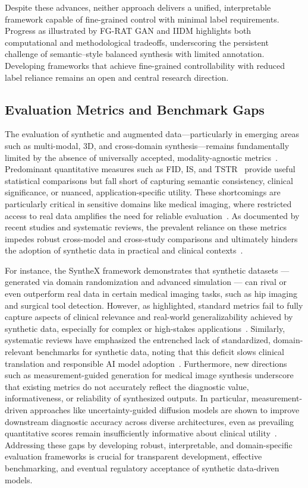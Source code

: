 \documentclass[sigconf]{acmart}
\begin{document}
Despite these advances, neither approach delivers a unified, interpretable framework capable of fine-grained control with minimal label requirements. Progress as illustrated by FG-RAT GAN and IIDM highlights both computational and methodological tradeoffs, underscoring the persistent challenge of semantic–style balanced synthesis with limited annotation. Developing frameworks that achieve fine-grained controllability with reduced label reliance remains an open and central research direction.

\subsection{Evaluation Metrics and Benchmark Gaps}

The evaluation of synthetic and augmented data—particularly in emerging areas such as multi-modal, 3D, and cross-domain synthesis—remains fundamentally limited by the absence of universally accepted, modality-agnostic metrics~\cite{ref35,ref52,ref53,ref81,ref89,ref91}. Predominant quantitative measures such as FID, IS, and TSTR~\cite{ref35,ref52,ref53} provide useful statistical comparisons but fall short of capturing semantic consistency, clinical significance, or nuanced, application-specific utility. These shortcomings are particularly critical in sensitive domains like medical imaging, where restricted access to real data amplifies the need for reliable evaluation~\cite{ref81,ref91}. As documented by recent studies and systematic reviews, the prevalent reliance on these metrics impedes robust cross-model and cross-study comparisons and ultimately hinders the adoption of synthetic data in practical and clinical contexts~\cite{ref81,ref89,ref91}. 

For instance, the SyntheX framework demonstrates that synthetic datasets — generated via domain randomization and advanced simulation — can rival or even outperform real data in certain medical imaging tasks, such as hip imaging and surgical tool detection. However, as highlighted, standard metrics fail to fully capture aspects of clinical relevance and real-world generalizability achieved by synthetic data, especially for complex or high-stakes applications~\cite{ref81}. Similarly, systematic reviews have emphasized the entrenched lack of standardized, domain-relevant benchmarks for synthetic data, noting that this deficit slows clinical translation and responsible AI model adoption~\cite{ref89}. Furthermore, new directions such as measurement-guided generation for medical image synthesis underscore that existing metrics do not accurately reflect the diagnostic value, informativeness, or reliability of synthesized outputs. In particular, measurement-driven approaches like uncertainty-guided diffusion models are shown to improve downstream diagnostic accuracy across diverse architectures, even as prevailing quantitative scores remain insufficiently informative about clinical utility~\cite{ref91}. Addressing these gaps by developing robust, interpretable, and domain-specific evaluation frameworks is crucial for transparent development, effective benchmarking, and eventual regulatory acceptance of synthetic data-driven models.
\end{document}
